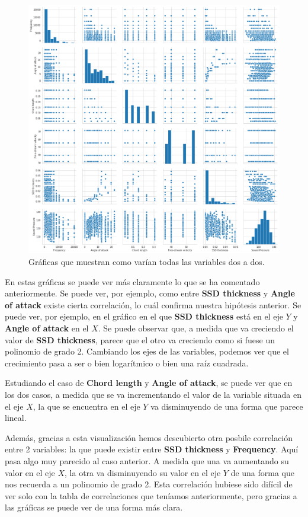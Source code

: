 \documentclass[11pt,a4paper]{article}
\begin{document}
\begin{figure}[H]
\centering
\includegraphics[scale=0.35]{img/output_17_0.png}
\caption{Gráficas que muestran como varían todas las variables dos a dos.}
\end{figure}

En estas gráficas se puede ver más claramente lo que se ha comentado
anteriormente. Se puede ver, por ejemplo, como entre \textbf{SSD
thickness} y \textbf{Angle of attack} existe cierta correlación, lo cuál
confirma nuestra hipótesis anterior. Se puede ver, por ejemplo, en el
gráfico en el que \textbf{SSD thickness} está en el eje \(Y\) y
\textbf{Angle of attack} en el \(X\). Se puede observar que, a medida
que va creciendo el valor de \textbf{SSD thickness}, parece que el otro
va creciendo como si fuese un polinomio de grado 2. Cambiando los ejes
de las variables, podemos ver que el crecimiento pasa a ser o bien
logarítmico o bien una raíz cuadrada.

Estudiando el caso de \textbf{Chord length} y \textbf{Angle of attack},
se puede ver que en los dos casos, a medida que se va incrementando el
valor de la variable situada en el eje \(X\), la que se encuentra en el
eje \(Y\) va disminuyendo de una forma que parece lineal.

Además, gracias a esta visualización hemos descubierto otra posbile
correlación entre 2 variables: la que puede existir entre \textbf{SSD
thickness} y \textbf{Frequency}. Aquí pasa algo muy parecido al caso
anterior. A medida que una va aumentando su valor en el eje \(X\), la
otra va disminuyendo su valor en el eje \(Y\) de una forma que nos
recuerda a un polinomio de grado 2. Esta correlación hubiese sido
difícil de ver solo con la tabla de correlaciones que teníamos
anteriormente, pero gracias a las gráficas se puede ver de una forma más
clara.
\end{document}
